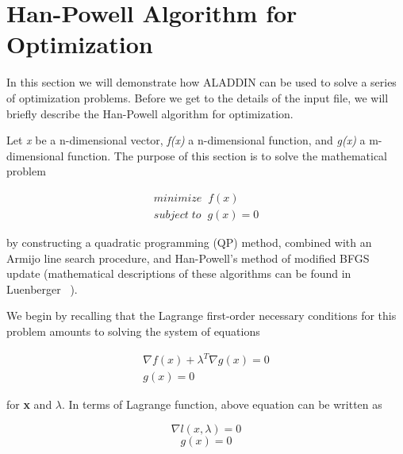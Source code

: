 \clearpage
\section{Han-Powell Algorithm for Optimization}

\vspace{0.15 in}
\noindent\hspace{0.5 in}
In this section we will demonstrate how ALADDIN can be
used to solve a series of optimization problems.
Before we get to the details of the input file,
we will briefly describe the Han-Powell algorithm
for optimization.

\vspace{0.15 in}
\noindent\hspace{0.5 in}
Let {\em x} be a n-dimensional vector,
{\em f(x)} a n-dimensional function,
and {\em g(x)} a m-dimensional function.
The purpose of this section is to solve the mathematical problem

\begin{equation}
\begin{array}{l}
minimize  \;\; f(x)     \\
subject\;to\;\; g(x) = 0 
\end{array}
\label{eq: min_func}
\end{equation}

\vspace{0.1 in}\noindent
by constructing a quadratic programming (QP) method,
combined with an Armijo line search procedure,
and Han-Powell's method of modified BFGS
update (mathematical descriptions of these algorithms can be
found in Luenberger ~\cite{Luenberger84}).

\vspace{0.15 in}
\noindent\hspace{0.5 in}
We begin by recalling that the Lagrange first-order necessary conditions
for this problem amounts to solving the system of equations

\begin{equation}
\begin{array}{l}
\nabla f(x) + \lambda^T \nabla g(x) = 0  \\
g(x)                                = 0
\end{array}
\label{eq: min_lagrange}
\end{equation}

\noindent
for {\bf x} and {\bf $\lambda$}.
In terms of Lagrange function, above equation can be written as

\[ \nabla l(x, \lambda) = 0                \]
\[ g(x)                                = 0 \]

